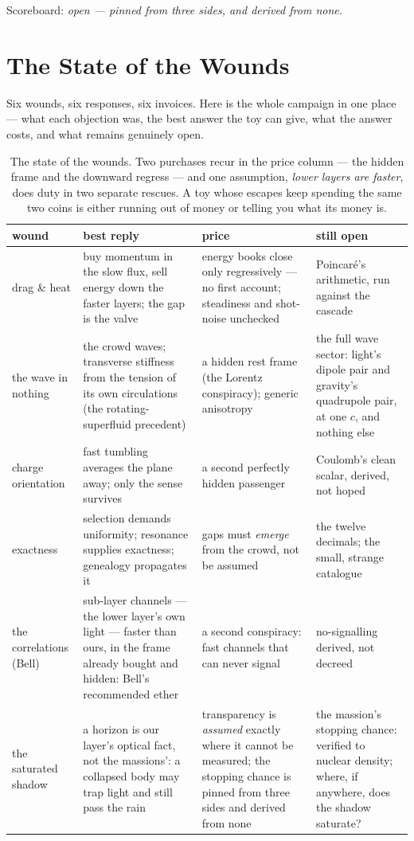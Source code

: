 \documentclass[fontsize=11pt,paper=a4,pagesize=auto,parskip=half-]{scrbook}
\begin{document}
Scoreboard: \emph{open --- pinned from three sides, and derived from none.}

\section{The State of the Wounds}

Six wounds, six responses, six invoices. Here is the whole campaign in one place --- what each objection was, the best answer the toy can give, what the answer costs, and what remains genuinely open.

\begin{table}[htbp]
\centering
\small
\setlength{\tabcolsep}{3.5pt}
\begin{tabular}{P{1.85cm}P{3.05cm}P{2.9cm}P{2.6cm}}
\toprule
\textbf{wound} & \textbf{best reply} & \textbf{price} & \textbf{still open} \\
\midrule
drag \& heat & buy momentum in the slow flux, sell energy down the faster layers; the gap is the valve & energy books close only regressively --- no first account; steadiness and shot-noise unchecked & Poincar\'e's arithmetic, run against the cascade \\
\addlinespace
the wave in nothing & the crowd waves; transverse stiffness from the tension of its own circulations (the rotating-superfluid precedent) & a hidden rest frame (the Lorentz conspiracy); generic anisotropy & the full wave sector: light's dipole pair and gravity's quadrupole pair, at one $c$, and nothing else \\
\addlinespace
charge orientation & fast tumbling averages the plane away; only the sense survives & a second perfectly hidden passenger & Coulomb's clean scalar, derived, not hoped \\
\addlinespace
exactness & selection demands uniformity; resonance supplies exactness; genealogy propagates it & gaps must \emph{emerge} from the crowd, not be assumed & the twelve decimals; the small, strange catalogue \\
\addlinespace
the correlations (Bell) & sub-layer channels --- the lower layer's own light --- faster than ours, in the frame already bought and hidden: Bell's recommended ether & a second conspiracy: fast channels that can never signal & no-signalling derived, not decreed \\
\addlinespace
the saturated shadow & a horizon is our layer's optical fact, not the massions': a collapsed body may trap light and still pass the rain & transparency is \emph{assumed} exactly where it cannot be measured; the stopping chance is pinned from three sides and derived from none & the massion's stopping chance: verified to nuclear density; where, if anywhere, does the shadow saturate? \\
\bottomrule
\end{tabular}
\caption{The state of the wounds. Two purchases recur in the price column --- the hidden frame and the downward regress --- and one assumption, \emph{lower layers are faster}, does duty in two separate rescues. A toy whose escapes keep spending the same two coins is either running out of money or telling you what its money is.}
\label{tab:wounds}
\end{table}
\end{document}
